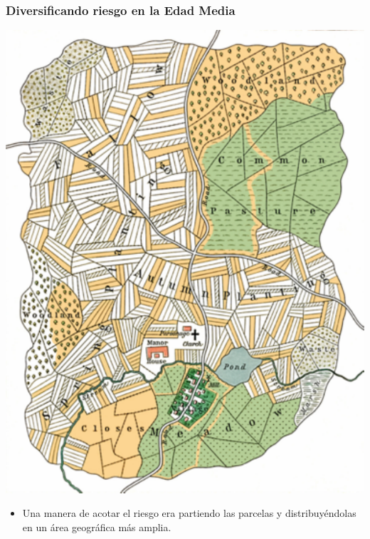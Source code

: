 \documentclass{beamer}
\begin{document}
\begin{frame}
\frametitle{Diversificando riesgo en la Edad Media}
\centering
\includegraphics[scale=0.4]{../PastedGraphic-1.pdf}

\begin{itemize}
    \item Una manera de acotar el riesgo era partiendo las parcelas y distribuyéndolas en un área geográfica más amplia. 
\end{itemize}
\end{frame}
\end{document}
